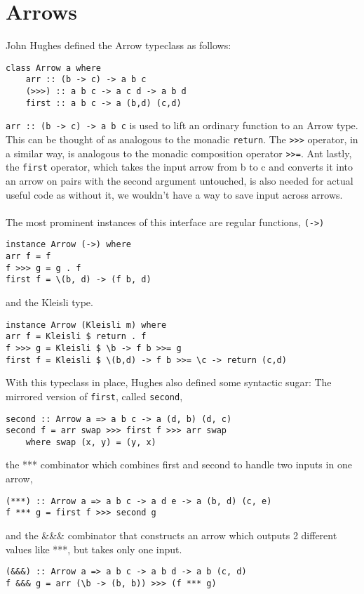 \section{Arrows}

John Hughes defined the Arrow typeclass as follows\citHughes:
\begin{lstlisting}[frame=htrbl]
class Arrow a where
	arr :: (b -> c) -> a b c
	(>>>) :: a b c -> a c d -> a b d
	first :: a b c -> a (b,d) (c,d)
\end{lstlisting}
\lstinline{arr :: (b -> c) -> a b c} is used to lift an ordinary function to an Arrow type. This can be thought of as analogous to the monadic \lstinline{return}. The \lstinline{>>>} operator, in a similar way, is analogous to the monadic composition operator \lstinline{>>=}. Ant lastly, the \lstinline{first} operator, which takes the input arrow from b to c and converts it into an arrow on pairs with the second argument untouched, is also needed for actual useful code as without it, we wouldn't have a way to save input across arrows.
\\\\
The most prominent instances of this interface are regular functions, \lstinline{(->)}
\begin{lstlisting}[frame=htrbl]
instance Arrow (->) where
arr f = f
f >>> g = g . f
first f = \(b, d) -> (f b, d) 
\end{lstlisting}
and the Kleisli type.
\begin{lstlisting}[frame=htrbl]
instance Arrow (Kleisli m) where
arr f = Kleisli $ return . f
f >>> g = Kleisli $ \b -> f b >>= g
first f = Kleisli $ \(b,d) -> f b >>= \c -> return (c,d)
\end{lstlisting}
With this typeclass in place, Hughes also defined some syntactic sugar: The mirrored version of \lstinline{first}, called \lstinline{second},
\begin{lstlisting}[frame=htrbl]
second :: Arrow a => a b c -> a (d, b) (d, c)
second f = arr swap >>> first f >>> arr swap
	where swap (x, y) = (y, x)
\end{lstlisting}
the *** combinator which combines first and second to handle two inputs in one arrow,
\begin{lstlisting}[frame=htrbl]
(***) :: Arrow a => a b c -> a d e -> a (b, d) (c, e)
f *** g = first f >>> second g
\end{lstlisting}
and the \&\&\& combinator that constructs an arrow which outputs 2 different values like ***, but takes only one input.
\begin{lstlisting}[frame=htrbl]
(&&&) :: Arrow a => a b c -> a b d -> a b (c, d)
f &&& g = arr (\b -> (b, b)) >>> (f *** g)
\end{lstlisting}
